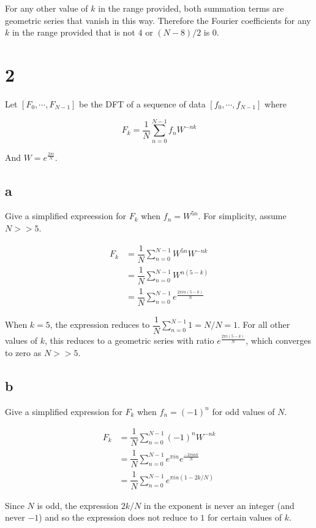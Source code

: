 \documentclass[11pt]{article}
\begin{document}
For any other value of $k$ in the range provided, both summation terms are geometric series that vanish in this way. Therefore the Fourier coefficients for any $k$ in the range provided that is not $4$ or $(N - 8)/2$ is $0$.

\newpage

\section{2}

Let $[F_0, \cdots, F_{N-1}]$ be the DFT of a sequence of data $[f_0, \cdots, f_{N-1}]$ where

\[ F_k = \dfrac{1}{N} \sum_{n=0}^{N-1} f_n W^{-nk} \]

And $W = e^{\frac{2\pi i}{N}}$.

\subsection{a} Give a simplified expreession for $F_k$ when $f_n = W^{5n}$. For simplicity, assume $N >> 5$.

\begin{align*}
  F_k &= \dfrac{1}{N} \sum_{n=0}^{N-1} W^{5n} W^{-nk} \\
  &= \dfrac{1}{N} \sum_{n=0}^{N-1} W^{n(5 - k)} \\
  &= \dfrac{1}{N} \sum_{n=0}^{N-1} e^{\frac{2 \pi i n (5 - k)}{N}}
\end{align*}

When $k = 5$, the expression reduces to $\dfrac{1}{N} \sum_{n=0}^{N-1} 1 = N / N = 1$. For all other values of $k$, this reduces to a geometric series with ratio $e^{\frac{2 \pi i (5 - k)}{N}}$, which converges to zero as $N >> 5$.

\subsection{b} Give a simplified expression for $F_k$ when $f_n = (-1)^n$ for odd values of $N$.

\begin{align*}
  F_k &= \dfrac{1}{N} \sum_{n=0}^{N-1} (-1)^n W^{-nk} \\
  &= \dfrac{1}{N} \sum_{n=0}^{N-1}  e^{\pi i n} e^{\frac{- 2 \pi i n k}{N}} \\
  &= \dfrac{1}{N} \sum_{n=0}^{N-1}  e^{\pi i n (1 -2k/N)}
\end{align*}

Since $N$ is odd, the expression $2k / N$ in the exponent is never an integer (and never $-1$) and so the expression does not reduce to $1$ for certain values of $k$.
\end{document}
